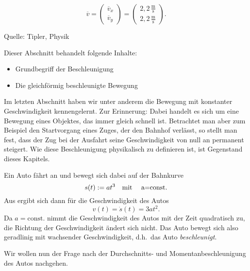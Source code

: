 \begin{MExercises}
\begin{MExercise}
\begin{MSolution}
\begin{enumerate}
                   $$
                   \overline{v}= \left(\begin{array}{c} \overline{v}_x \\ \overline{v}_y \end{array}\right)=\left(\begin{array}{c} {2,2}\,\frac{\text{m}}{\text{s}}\\ {2,2}\,\frac{\text{m}}{\text{s}} \end{array}\right).
                   $$
                 \end{enumerate}
                 
                 \end{MSolution}
                 
                 Quelle: Tipler, Physik
                 \end{MExercise}

\end{MExercises}
   
 
  
  \begin{MIntro} 
  
 Dieser Abschnitt behandelt folgende Inhalte:
 \begin{itemize}
 \item{Grundbegriff der Beschleunigung}
 \item{Die gleichf\"ormig beschleunigte Bewegung}
 \end{itemize} 
  
Im letzten Abschnitt haben wir unter anderem die Bewegung mit konstanter Geschwindigkeit kennengelernt. Zur Erinnerung: Dabei handelt es sich um eine Bewegung eines Objektes, das immer gleich schnell ist. Betrachtet man aber zum Beispiel den Startvorgang eines Zuges, der den Bahnhof verl\"asst, so stellt man fest, dass der Zug bei der Ausfahrt seine Geschwindigkeit von null an permanent steigert. Wie diese Beschleunigung physikalisch zu definieren ist, ist Gegenstand dieses Kapitels.


  \begin{MExample}
  Ein Auto f\"ahrt an und bewegt sich dabei auf der Bahnkurve
  $$
  s(t):=a t^3 \quad \text{mit \quad a=\textrm{const.}}
  $$ Aus  ergibt sich dann f\"ur die Geschwindigkeit des Autos
  $$
  v(t)=\dot{s}(t)=3a t^2.
  $$
  Da $a=\textrm{const.}$ nimmt die Geschwindigkeit des Autos mit der Zeit quadratisch zu, die Richtung der Geschwindigkeit \"andert sich nicht. Das Auto bewegt sich also geradlinig mit wachsender Geschwindigkeit, d.h.~das Auto \textit{beschleunigt}.
   \end{MExample}
 
 Wir wollen nun der Frage nach der Durchschnitts- und Momentanbeschleunigung des Autos nachgehen.
 
  \end{MIntro}

